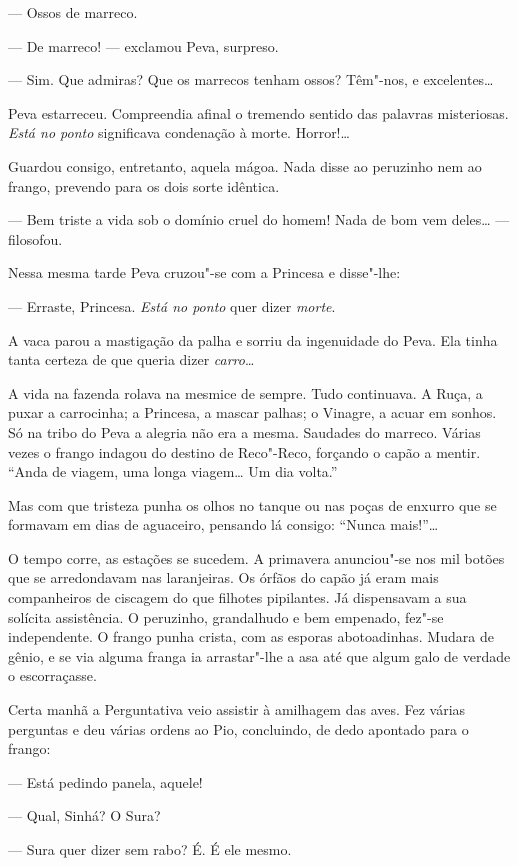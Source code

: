 --- Ossos de marreco.

--- De marreco! --- exclamou Peva, surpreso.

--- Sim. Que admiras? Que os marrecos tenham ossos? Têm"-nos, e
excelentes\ldots{}

Peva estarreceu. Compreendia afinal o tremendo sentido das palavras
misteriosas. \emph{Está no ponto} significava condenação à morte.
Horror!\ldots{}

Guardou consigo, entretanto, aquela mágoa. Nada disse ao peruzinho nem
ao frango, prevendo para os dois sorte idêntica.

--- Bem triste a vida sob o domínio cruel do homem! Nada de bom vem
deles\ldots{} --- filosofou.

Nessa mesma tarde Peva cruzou"-se com a Princesa e disse"-lhe:

--- Erraste, Princesa. \emph{Está no ponto} quer dizer \emph{morte}.

A vaca parou a mastigação da palha e sorriu da ingenuidade do Peva. Ela
tinha tanta certeza de que queria dizer \emph{carro}\ldots{}

A vida na fazenda rolava na mesmice de sempre. Tudo continuava. A Ruça,
a puxar a carrocinha; a Princesa, a mascar palhas; o Vinagre, a acuar em
sonhos. Só na tribo do Peva a alegria não era a mesma. Saudades do
marreco. Várias vezes o frango indagou do destino de Reco"-Reco, forçando
o capão a mentir. ``Anda de viagem, uma longa viagem\ldots{} Um dia volta.''

Mas com que tristeza punha os olhos no tanque ou nas poças de enxurro
que se formavam em dias de aguaceiro, pensando lá consigo: ``Nunca
mais!''\ldots{}

O tempo corre, as estações se sucedem. A primavera anunciou"-se nos mil
botões que se arredondavam nas laranjeiras. Os órfãos do capão já eram
mais companheiros de ciscagem do que filhotes pipilantes. Já dispensavam
a sua solícita assistência. O peruzinho, grandalhudo e bem empenado,
fez"-se independente. O frango punha crista, com as esporas abotoadinhas.
Mudara de gênio, e se via alguma franga ia arrastar"-lhe a asa até que
algum galo de verdade o escorraçasse.

Certa manhã a Perguntativa veio assistir à amilhagem das aves. Fez
várias perguntas e deu várias ordens ao Pio, concluindo, de dedo
apontado para o frango:

--- Está pedindo panela, aquele!

--- Qual, Sinhá? O Sura?

--- Sura quer dizer sem rabo? É. É ele mesmo.

